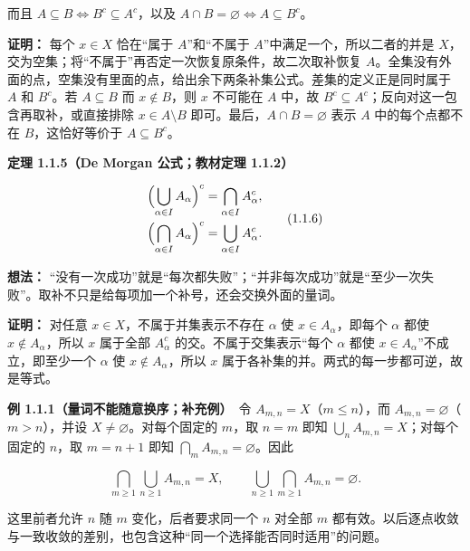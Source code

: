 \documentclass[11pt,a4paper]{article}
\begin{document}
而且 \(A\subseteq B\iff B^c\subseteq A^c\)，以及
\(A\cap B=\varnothing\iff A\subseteq B^c\)。

\textbf{证明：} 每个 \(x\in X\) 恰在``属于 \(A\)''和``不属于
\(A\)''中满足一个，所以二者的并是
\(X\)，交为空集；将``不属于''再否定一次恢复原条件，故二次取补恢复
\(A\)。全集没有外面的点，空集没有里面的点，给出余下两条补集公式。差集的定义正是同时属于
\(A\) 和 \(B^c\)。若 \(A\subseteq B\) 而 \(x\notin B\)，则 \(x\)
不可能在 \(A\) 中，故
\(B^c\subseteq A^c\)；反向对这一包含再取补，或直接排除
\(x\in A\setminus B\) 即可。最后，\(A\cap B=\varnothing\) 表示 \(A\)
中的每个点都不在 \(B\)，这恰好等价于 \(A\subseteq B^c\)。

\textbf{定理 1.1.5（De Morgan 公式；教材定理 1.1.2）}

\begin{equation*}
\begin{aligned}
\Bigl(\bigcup_{\alpha\in I}A_\alpha\Bigr)^c
 &=\bigcap_{\alpha\in I}A_\alpha^c,\\
\Bigl(\bigcap_{\alpha\in I}A_\alpha\Bigr)^c
 &=\bigcup_{\alpha\in I}A_\alpha^c.
\end{aligned}\tag{1.1.6}
\end{equation*}

\textbf{想法：}
``没有一次成功''就是``每次都失败''；``并非每次成功''就是``至少一次失败''。取补不只是给每项加一个补号，还会交换外面的量词。

\textbf{证明：} 对任意 \(x\in X\)，不属于并集表示不存在 \(\alpha\) 使
\(x\in A_\alpha\)，即每个 \(\alpha\) 都使 \(x\notin A_\alpha\)，所以
\(x\) 属于全部 \(A_\alpha^c\) 的交。不属于交集表示``每个 \(\alpha\) 都使
\(x\in A_\alpha\)''不成立，即至少一个 \(\alpha\) 使
\(x\notin A_\alpha\)，所以 \(x\)
属于各补集的并。两式的每一步都可逆，故是等式。

\textbf{例 1.1.1（量词不能随意换序；补充例）}　令
\(A_{m,n}=X\)（\(m\le n\)），而 \(A_{m,n}=\varnothing\)（\(m>n\)），并设
\(X\ne\varnothing\)。对每个固定的 \(m\)，取 \(n=m\) 即知
\(\bigcup_n A_{m,n}=X\)；对每个固定的 \(n\)，取 \(m=n+1\) 即知
\(\bigcap_m A_{m,n}=\varnothing\)。因此

\begin{equation*}
\bigcap_{m\ge1}\bigcup_{n\ge1}A_{m,n}=X,
\qquad
\bigcup_{n\ge1}\bigcap_{m\ge1}A_{m,n}=\varnothing.
\tag{1.1.7}
\end{equation*}

这里前者允许 \(n\) 随 \(m\) 变化，后者要求同一个 \(n\) 对全部 \(m\)
都有效。以后逐点收敛与一致收敛的差别，也包含这种``同一个选择能否同时适用''的问题。
\end{document}
